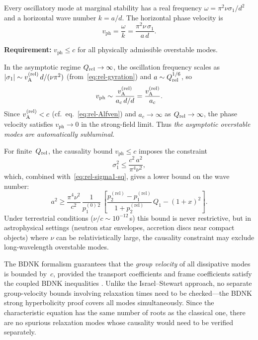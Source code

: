\begin{causalitycheck}
Every oscillatory mode at marginal stability has a real frequency
$\omega = \pi^{2}\nu\sigma_{1}/d^{2}$ and a horizontal wave number
$k = a/d$.  The horizontal phase velocity is
\begin{equation}
  v_{\mathrm{ph}} = \frac{\omega}{k}
  = \frac{\pi^{2}\nu\,\sigma_{1}}{a\,d} .
  \label{eq:rel-vph}
\end{equation}

\textbf{Requirement:} $v_{\mathrm{ph}} \le c$ for all physically
admissible overstable modes.

In the asymptotic regime $Q_{\mathrm{rel}}\to\infty$, the oscillation frequency
scales as $|\sigma_{1}|\sim v_{\mathrm{A}}^{(\mathrm{rel})}\,d/(\nu\pi^{2})$
(from~\eqref{eq:rel-gyration}) and $a\sim Q_{\mathrm{rel}}^{1/6}$, so
\begin{equation}
  v_{\mathrm{ph}}
  \sim \frac{v_{\mathrm{A}}^{(\mathrm{rel})}}{a_{c}\,d/d}
  = \frac{v_{\mathrm{A}}^{(\mathrm{rel})}}{a_{c}} .
  \label{eq:rel-vph-asymp}
\end{equation}
Since $v_{\mathrm{A}}^{(\mathrm{rel})} < c$ (cf.\ eq.~\eqref{eq:rel-Alfven}) and
$a_{c}\to\infty$ as $Q_{\mathrm{rel}}\to\infty$, the phase velocity satisfies
$v_{\mathrm{ph}}\to 0$ in the strong-field limit.  Thus \emph{the
asymptotic overstable modes are automatically subluminal}.

For finite~$Q_{\mathrm{rel}}$, the causality bound $v_{\mathrm{ph}} \le c$ imposes
the constraint
\begin{equation}
  \sigma_{1}^{2} \le \frac{c^{2}\,a^{2}}{\pi^{4}\nu^{2}} ,
  \label{eq:rel-causality-bound}
\end{equation}
which, combined with~\eqref{eq:rel-sigma1-sq}, gives a lower bound on
the wave number:
\begin{equation}
  a^{2} \ge \frac{\pi^{4}\nu^{2}}{c^{2}}\,
  \frac{1}{p_{1}^{(0)\,2}}\,
  \left[\frac{p_{2}^{(\mathrm{rel})}-p_{1}^{(\mathrm{rel})}}{1+p_{2}^{(\mathrm{rel})}}\,Q_{1}
        - (1+x)^{2}\right] .
  \label{eq:rel-a-causality-lower}
\end{equation}
Under terrestrial conditions ($\nu/c \sim 10^{-12}$\,s) this bound is
never restrictive, but in astrophysical settings (neutron star envelopes,
accretion discs near compact objects) where $\nu$ can be relativistically
large, the causality constraint may exclude long-wavelength overstable
modes.

The BDNK formalism guarantees that the
\emph{group velocity} of all dissipative modes is bounded by~$c$,
provided the transport coefficients and frame coefficients satisfy
the coupled BDNK inequalities
\citep{BemficaDN2018,Kovtun2019,BemficaDNK2023}.
Unlike the Israel--Stewart approach, no separate group-velocity
bounds involving relaxation times need to be checked---the BDNK
strong hyperbolicity proof covers all modes simultaneously.
Since the characteristic equation has the same number of roots as
the classical one, there are no spurious relaxation modes whose
causality would need to be verified separately.
\end{causalitycheck}

